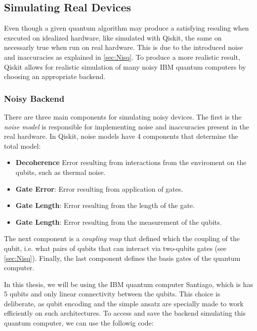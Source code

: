\subsection{Simulating Real Devices}\label{sec:Simulating Real Devices}

Even though a given quantum algorithm may produce a satisfying resuling when executed on idealized hardware, like simulated with Qiskit, the same on necessarly true when run on real hardware. This is due to the introduced noise and inaccuracies as explained in \autoref{sec:Nisq}. To produce a more realistic result, Qiskit allows for realistic simulation of many noisy IBM quantum computers by choosing an appropriate backend. 

\subsubsection*{Noisy Backend}

There are three main components for simulating noisy devices. The first is the \emph{noise model} is responsible for implementing noise and inaccuracies present in the real hardware. In Qiskit, noise models have 4 components that determine the total model:

\begin{itemize}
    \item \textbf{Decoherence} Error resulting from interactions from the enviroment on the qubits, such as thermal noise.
    \item \textbf{Gate Error}: Error resulting from application of gates.
    \item \textbf{Gate Length}: Error resulting from the length of the gate.
    \item \textbf{Gate Length}: Error resulting from the measurement of the qubits. 
\end{itemize}

The next component is a \emph{coupling map} that defined which the coupling of the qubit, i.e. what pairs of qubits that can interact via two-qubits gates (see \autoref{sec:Nisq}). Finally, the last component defines the basis gates of the quantum computer. 

In this thesis, we will be using the IBM quantum computer Santiago, which is has 5 qubits and only linear connectivity between the qubits. This choice is deliberate, as qubit encoding and the simple ansatz are specially made to work efficiently on such architectures. To access and save the backend simulating this quantum computer, we can use the followig code:

